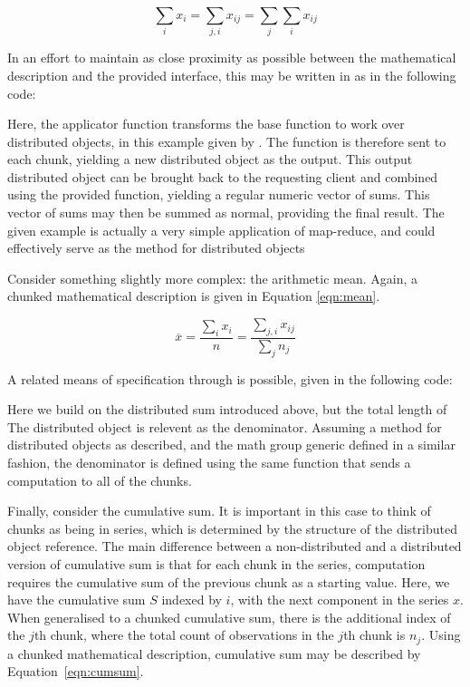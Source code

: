\documentclass[letterpaper, inpress]{jds} %
\begin{document}
\begin{equation}\label{eqn:sum}
    \sum_i x_i= \sum_{j,i}x_{ij} = \sum_j\sum_i x_{ij}
\end{equation}

In an effort to maintain as close proximity as possible between the mathematical description and the provided interface, this may be written in  as in the following  code:


Here, the  applicator function transforms the base  function to work over distributed objects, in this example given by .
The  function is therefore sent to each chunk, yielding a new distributed object as the output.
This output distributed object can be brought back to the requesting client and combined using the provided  function, yielding a regular  numeric vector of sums.
This vector of sums may then be summed as normal, providing the final result.
The given example is actually a very simple application of map-reduce, and could effectively serve as the  method for distributed objects

Consider something slightly more complex: the arithmetic mean.
Again, a chunked mathematical description is given in Equation \ref{eqn:mean}.

\begin{equation}\label{eqn:mean}
    \overline{x} = \frac{\sum_{i}x_{i}}{n} = \frac{\sum_{j,i}x_{ij}}{\sum_j n_j}
\end{equation}

A related means of specification through  is possible, given in the following code:


Here we build on the distributed sum introduced above, but the total length of The distributed object is relevent as the denominator.
Assuming a  method for distributed objects as described, and the math group generic defined in a similar fashion, the denominator is defined using the same  function that sends a  computation to all of the chunks.

Finally, consider the cumulative sum.
It is important in this case to think of chunks as being in series, which is determined by the structure of the distributed object reference.
The main difference between a non-distributed and a distributed version of cumulative sum is that for each chunk in the series, computation requires the cumulative sum of the previous chunk as a starting value.
Here, we have the cumulative sum $S$ indexed by $i$, with the next component in the series $x$.
When generalised to a chunked cumulative sum, there is the additional index of the $j$th chunk, where the total count of observations in the $j$th chunk is $n_j$.
Using a chunked mathematical description, cumulative sum may be described by Equation~\ref{eqn:cumsum}.
\end{document}
